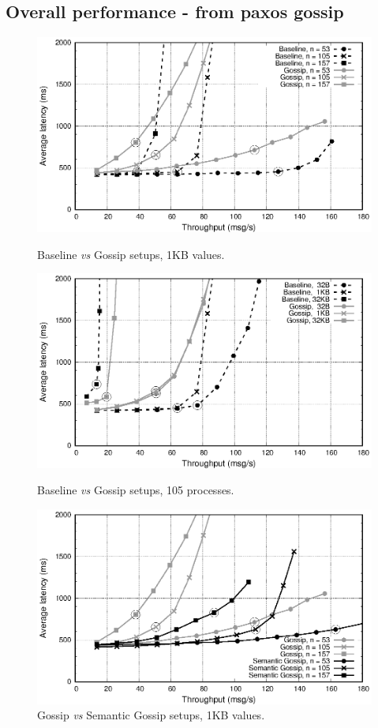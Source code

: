 \subsection{Overall performance - from paxos gossip}

\begin{figure}[!htbp]
\centering

\includegraphics[width=\columnwidth]{figures/lat-th-n-star-gossip.eps}
\caption{Baseline {\em vs} Gossip setups, 1KB values.}
\label{fig:n-b-g}
\includegraphics[width=\columnwidth]{figures/lat-th-size-star-gossip.eps}
\caption{Baseline {\em vs} Gossip setups, 105 processes.}
\label{fig:s-b-g}

\includegraphics[width=\columnwidth]{figures/lat-th-n-gossip-semantic.eps}
\caption{Gossip {\em vs} Semantic Gossip setups, 1KB values.}
\label{fig:n-g-s}


\end{figure}
